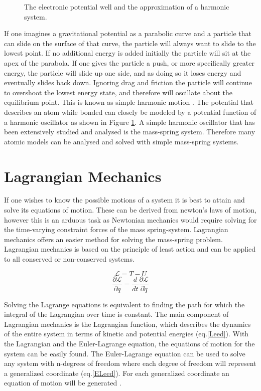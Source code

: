 \documentclass[hidelinks]{article}
\begin{document}
\begin{multicols}{2}
\begin{figure}[H]
\caption{The electronic potential well and the approximation of a harmonic system.\cite{3}}
\label{fig2}
\end{figure}
If one imagines a gravitational potential as a parabolic curve and a particle that can slide on the surface of that curve, the particle will always want to slide to the lowest point. If no additional energy is added initially the particle will sit at the apex of the parabola. If one gives the particle a push, or more specifically greater energy, the particle will slide up one side, and as doing so it loses energy and eventually slides back down. Ignoring drag and friction the particle will continue to overshoot the lowest energy state, and therefore will oscillate about the equilibrium point. This is known as simple harmonic motion \cite{1}. The potential that describes an atom while bonded can closely be modeled by a potential function of a harmonic oscillator as shown in Figure \ref{fig2}. A simple harmonic oscillator that has been extensively studied and analysed is the mass-spring system. Therefore many atomic models can be analysed and solved with simple mass-spring systems.


\section{Lagrangian Mechanics}

If one wishes to know the possible motions of a system it is best to attain and solve its equations of motion. These can be derived from newton's laws of motion, however this is an arduous task as Newtonian mechanics would require solving for the time-varying constraint forces of the mass spring-system. Lagrangian mechanics offers an easier method for solving the mass-spring problem. Lagrangian mechanics is based on the principle of least action and can be applied to all conserved or non-conserved systems. \cite{1}

\begin{equation}
\label{Leed}
\mathcal{L}=T-U
\end{equation}
\begin{equation}
\label{ELeed}
\frac{\partial \mathcal{L}}{\partial q}=\frac{d}{dt}\frac{\partial \mathcal{L}}{\partial \dot{q}}
\end{equation}

Solving the Lagrange equations is equivalent to finding the path for which the integral of the Lagrangian over time is constant. The main component of Lagrangian mechanics is the Lagrangian function, which describes the dynamics of the entire system in terms of kinetic and potential energies (eq.\ref{Leed}). With the Lagrangian and the Euler-Lagrange equation, the equations of motion for the system can be easily found. The Euler-Lagrange equation can be used to solve any system with n-degrees of freedom where each degree of freedom will represent a generalized coordinate (eq.\ref{ELeed}). For each generalized coordinate an equation of motion will be generated \cite{1}. 


\end{multicols}
\end{document}
